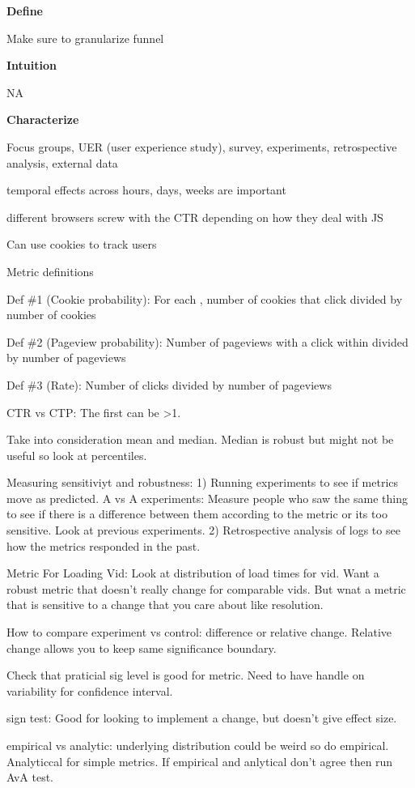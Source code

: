 \documentclass[]{book}
\theoremstyle{definition}
\theoremstyle{definition}
\theoremstyle{definition}
\theoremstyle{remark}
\begin{document}
\textbf{Define}

Make sure to granularize funnel

\textbf{Intuition}

NA

\textbf{Characterize}

Focus groups, UER (user experience study), survey, experiments,
retrospective analysis, external data

temporal effects across hours, days, weeks are important

different browsers screw with the CTR depending on how they deal with JS

Can use cookies to track users

Metric definitions

Def \#1 (Cookie probability): For each , number of cookies that click
divided by number of cookies

Def \#2 (Pageview probability): Number of pageviews with a click within
divided by number of pageviews

Def \#3 (Rate): Number of clicks divided by number of pageviews

CTR vs CTP: The first can be \textgreater{}1.

Take into consideration mean and median. Median is robust but might not
be useful so look at percentiles.

Measuring sensitiviyt and robustness: 1) Running experiments to see if
metrics move as predicted. A vs A experiments: Measure people who saw
the same thing to see if there is a difference between them according to
the metric or its too sensitive. Look at previous experiments. 2)
Retrospective analysis of logs to see how the metrics responded in the
past.

Metric For Loading Vid: Look at distribution of load times for vid. Want
a robust metric that doesn't really change for comparable vids. But wnat
a metric that is sensitive to a change that you care about like
resolution.

How to compare experiment vs control: difference or relative change.
Relative change allows you to keep same significance boundary.

Check that praticial sig level is good for metric. Need to have handle
on variability for confidence interval.

sign test: Good for looking to implement a change, but doesn't give
effect size.

empirical vs analytic: underlying distribution could be weird so do
empirical. Analyticcal for simple metrics. If empirical and anlytical
don't agree then run AvA test.
\end{document}
